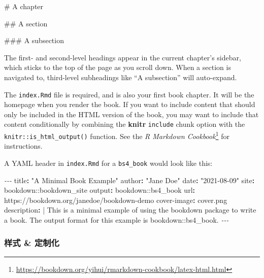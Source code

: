 \documentclass[
  12pt,
]{krantz}
\newenvironment{Shaded}{\begin{snugshade}}{\end{snugshade}}
\newcommand{\AttributeTok}[1]{\textcolor[rgb]{0.77,0.63,0.00}{#1}}
\newcommand{\CharTok}[1]{\textcolor[rgb]{0.31,0.60,0.02}{#1}}
\newcommand{\FunctionTok}[1]{\textcolor[rgb]{0.00,0.00,0.00}{#1}}
\newcommand{\KeywordTok}[1]{\textcolor[rgb]{0.13,0.29,0.53}{\textbf{#1}}}
\newcommand{\NormalTok}[1]{#1}
\newcommand{\PreprocessorTok}[1]{\textcolor[rgb]{0.56,0.35,0.01}{\textit{#1}}}
\newcommand{\StringTok}[1]{\textcolor[rgb]{0.31,0.60,0.02}{#1}}
\renewcommand{\href}[2]{#2\footnote{\url{#1}}}
\theoremstyle{definition}
\theoremstyle{definition}
\theoremstyle{definition}
\theoremstyle{definition}
\theoremstyle{remark}
\begin{document}
\begin{Shaded}
\begin{Highlighting}[]
\FunctionTok{\#   A chapter}

\FunctionTok{\#\#  A section}

\FunctionTok{\#\#\# A subsection}
\end{Highlighting}
\end{Shaded}

The first- and second-level headings appear in the current chapter's sidebar, which sticks to the top of the page as you scroll down. When a section is navigated to, third-level subheadings like ``A subsection'' will auto-expand.

The \texttt{index.Rmd} file is required, and is also your first book chapter. It will be the homepage when you render the book. If you want to include content that should only be included in the HTML version of the book, you may want to include that content conditionally by combining the \textbf{knitr} \texttt{include} chunk option with the \texttt{knitr::is\_html\_output()} function. See the \href{https://bookdown.org/yihui/rmarkdown-cookbook/latex-html.html}{\emph{R Markdown Cookbook}} for instructions.

A YAML header in \texttt{index.Rmd} for a \texttt{bs4\_book} would look like this:

\begin{Shaded}
\begin{Highlighting}[]
\PreprocessorTok{{-}{-}{-}}
\FunctionTok{title}\KeywordTok{:}\AttributeTok{ }\StringTok{"A Minimal Book Example"}
\FunctionTok{author}\KeywordTok{:}\AttributeTok{ }\StringTok{"Jane Doe"}
\FunctionTok{date}\KeywordTok{:}\AttributeTok{ }\StringTok{"2021{-}08{-}09"}
\FunctionTok{site}\KeywordTok{:}\AttributeTok{ bookdown::bookdown\_site}
\FunctionTok{output}\KeywordTok{:}\AttributeTok{ bookdown::bs4\_book}
\FunctionTok{url}\KeywordTok{:}\AttributeTok{ https://bookdown.org/janedoe/bookdown{-}demo}
\FunctionTok{cover{-}image}\KeywordTok{:}\AttributeTok{ cover.png}
\FunctionTok{description}\KeywordTok{: }\CharTok{|}
\NormalTok{  This is a minimal example of using the bookdown package to write a book.}
\NormalTok{  The output format for this example is bookdown::bs4\_book.}
\PreprocessorTok{{-}{-}{-}}
\end{Highlighting}
\end{Shaded}

\hypertarget{ux6837ux5f0f-ux5b9aux5236ux5316}{%
\subsubsection{样式 \& 定制化}\label{ux6837ux5f0f-ux5b9aux5236ux5316}}
\end{document}
